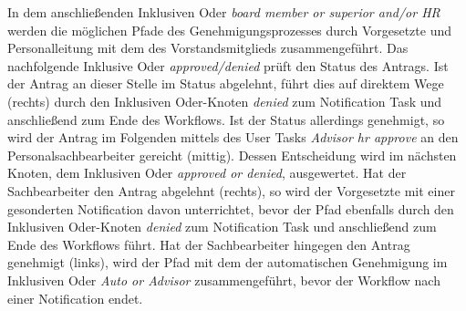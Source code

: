 In dem anschließenden Inklusiven Oder \textit{board member or superior and/or HR} werden die möglichen Pfade des Genehmigungsprozesses durch Vorgesetzte und Personalleitung mit dem des Vorstandsmitglieds zusammengeführt. Das nachfolgende Inklusive Oder \textit{approved/denied} prüft den Status des Antrags. Ist der Antrag an dieser Stelle im Status abgelehnt, führt dies auf direktem Wege (rechts) durch den Inklusiven Oder-Knoten \textit{denied} zum Notification Task und anschließend zum Ende des Workflows. Ist der Status allerdings genehmigt, so wird der Antrag im Folgenden mittels des User Tasks \textit{Advisor hr approve} an den Personalsachbearbeiter gereicht (mittig). Dessen Entscheidung wird im nächsten Knoten, dem Inklusiven Oder \textit{approved or denied}, ausgewertet. Hat der Sachbearbeiter den Antrag abgelehnt (rechts), so wird der Vorgesetzte mit einer gesonderten Notification davon unterrichtet, bevor der Pfad ebenfalls durch den Inklusiven Oder-Knoten \textit{denied} zum Notification Task und anschließend zum Ende des Workflows führt. Hat der Sachbearbeiter hingegen den Antrag genehmigt (links), wird der Pfad mit dem der automatischen Genehmigung im Inklusiven Oder \textit{Auto or Advisor} zusammengeführt, bevor der Workflow nach einer Notification endet. 


